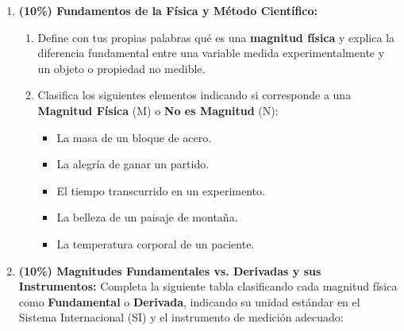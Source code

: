 \documentclass[11pt, letterpaper]{article}
\newif\ifshowanswers
\newcommand{\answer}[1]{
	\ifshowanswers
	\par\vspace{0.15cm}
	\begin{tcolorbox}[colback=blue!5!white, colframe=blue!60!white, arc=1mm, boxrule=0.5pt, title=\textbf{\footnotesize SOLUCIÓN PASO A PASO (DOCENTE)}]
		\color{blue!80!black}\footnotesize #1
	\end{tcolorbox}
	\par\vspace{0.15cm}
	\else
	\par\vspace{0.3cm}
	\fi
}
\begin{document}
	\begin{enumerate}[leftmargin=*, itemsep=0.8cm]
		
		\item \textbf{(10\%) Fundamentos de la Física y Método Científico:}
		\begin{enumerate}[label=\alph*), itemsep=0.2cm]
			\item Define con tus propias palabras qué es una \textbf{magnitud física} y explica la diferencia fundamental entre una variable medida experimentalmente y un objeto o propiedad no medible.
			\item Clasifica los siguientes elementos indicando si corresponde a una \textbf{Magnitud Física} (M) o \textbf{No es Magnitud} (N):
			\begin{itemize}[itemsep=0.1cm]
				\item [\textbf{[\quad]}] La masa de un bloque de acero.
				\item [\textbf{[\quad]}] La alegría de ganar un partido.
				\item [\textbf{[\quad]}] El tiempo transcurrido en un experimento.
				\item [\textbf{[\quad]}] La belleza de un paisaje de montaña.
				\item [\textbf{[\quad]}] La temperatura corporal de un paciente.
			\end{itemize}
		\end{enumerate}
		
		\answer{
			\textbf{a) Definición:} Una magnitud física es toda propiedad de un cuerpo o fenómeno natural que se puede medir cuantitativamente mediante un número y una unidad patrón estándar. Propiedades como sentimientos o apreciaciones estéticas no son magnitudes porque no se pueden medir con un instrumento unificado.\\[0.1cm]
			\textbf{b) Clasificación:} \\
			- Masa: \textbf{M} (Magnitud) \\
			- Alegría: \textbf{N} (No es magnitud) \\
			- Tiempo: \textbf{M} (Magnitud) \\
			- Belleza: \textbf{N} (No es magnitud) \\
			- Temperatura: \textbf{M} (Magnitud)
		}
		
		\item \textbf{(10\%) Magnitudes Fundamentales vs. Derivadas y sus Instrumentos:} 
		Completa la siguiente tabla clasificando cada magnitud física como \textbf{Fundamental} o \textbf{Derivada}, indicando su unidad estándar en el Sistema Internacional (SI) y el instrumento de medición adecuado:
		

\end{enumerate}
\end{document}
